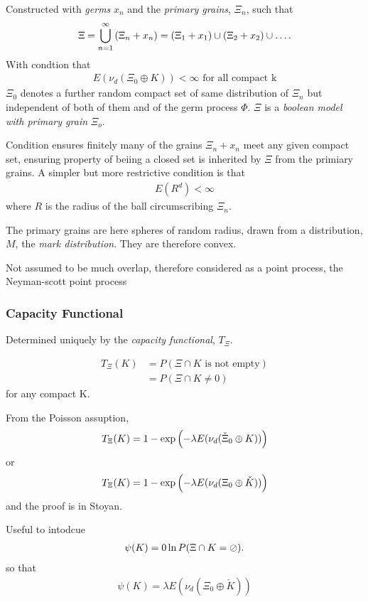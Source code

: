 Constructed with {\em germs} $x_n$ and the {\em primary grains}, $\Xi_n$, such that
\begin{align}
  \Xi = \bigcup_{n=1}^\infty \left( \Xi_n + x_n \right) = \left( \Xi_1 + x_1 \right) \cup \left( \Xi_2 + x_2 \right) \cup\ldots .
\end{align}
With condtion that 
\begin{align}
  E(\nu_d(\Xi_0 \oplus K)) < \infty \text{ for all compact k}
\end{align}
$\Xi_0$ denotes a further random compact set of same distribution of $\Xi_n$ but independent of both of them and of the germ process $\Phi$.
$\Xi$ is a {\em boolean model with primary grain } $\Xi_o$.

Condition ensures finitely many of the grains $\Xi_n+x_n$ meet any given compact set,
ensuring property of beiing a closed set is inherited by $\Xi$ from the primiary grains.
A simpler but more restrictive condition is that 
\begin{align}
  E(R^d) < \infty
\end{align}
where $R$ is the radius of the ball circumscribing $\Xi_n$.

The primary grains are here spheres of random radius, drawn from a distribution, $M$,
the {\em mark distribution}.
They are therefore convex.

Not assumed to be much overlap,
therefore considered as a point process, the Neyman-scott point process

\subsubsection{Capacity Functional}
Determined uniquely by the {\em capacity functional}, $T_\Xi$.

\begin{align}
T_\Xi (K) &= P(\Xi \cap K \text{ is not empty}) \\
&= P(\Xi \cap K \ne 0)
\end{align}
for any compact K.

From the Poisson assuption, 
\begin{align}
  T_\Xi (K) = 1 - \exp\left( -\lambda E(\nu_d(\check{\Xi}_0 \oplus K)) \right)
\end{align}
or 
\begin{align}
  T_\Xi (K) = 1 - \exp\left( -\lambda E(\nu_d({\Xi}_0 \oplus\check K)) \right)
\end{align}
and the proof is in Stoyan.

Useful to intodcue 
\begin{align}
  \psi(K) = 0 \ln P(\Xi \cap K = \oslash).
\end{align}
so that
\begin{align}
  \psi(K) = \lambda E(\nu_d(\Xi_0 \oplus \check K))
\end{align}

